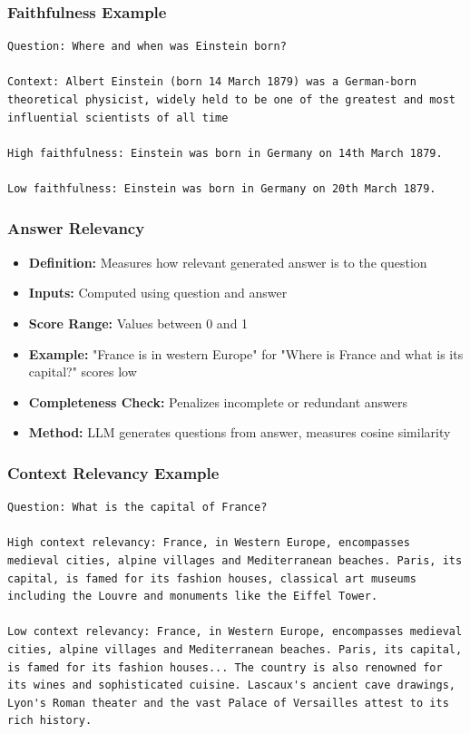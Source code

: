 \begin{frame}[fragile]\frametitle{Faithfulness Example}
  
\begin{lstlisting}
Question: Where and when was Einstein born?

Context: Albert Einstein (born 14 March 1879) was a German-born theoretical physicist, widely held to be one of the greatest and most influential scientists of all time

High faithfulness: Einstein was born in Germany on 14th March 1879.

Low faithfulness: Einstein was born in Germany on 20th March 1879.
\end{lstlisting}  
\end{frame}

\begin{frame}[fragile]\frametitle{Answer Relevancy}
  \begin{itemize}
    \item \textbf{Definition:} Measures how relevant generated answer is to the question
    \item \textbf{Inputs:} Computed using question and answer
    \item \textbf{Score Range:} Values between 0 and 1
    \item \textbf{Example:} "France is in western Europe" for "Where is France and what is its capital?" scores low
    \item \textbf{Completeness Check:} Penalizes incomplete or redundant answers
    \item \textbf{Method:} LLM generates questions from answer, measures cosine similarity
  \end{itemize}
\end{frame}

\begin{frame}[fragile]\frametitle{Context Relevancy Example}
  
\begin{lstlisting}
Question: What is the capital of France?

High context relevancy: France, in Western Europe, encompasses medieval cities, alpine villages and Mediterranean beaches. Paris, its capital, is famed for its fashion houses, classical art museums including the Louvre and monuments like the Eiffel Tower.

Low context relevancy: France, in Western Europe, encompasses medieval cities, alpine villages and Mediterranean beaches. Paris, its capital, is famed for its fashion houses... The country is also renowned for its wines and sophisticated cuisine. Lascaux's ancient cave drawings, Lyon's Roman theater and the vast Palace of Versailles attest to its rich history.
\end{lstlisting}  
\end{frame}

